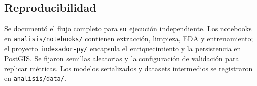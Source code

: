 \subsection*{Reproducibilidad}
Se documentó el flujo completo para su ejecución independiente. Los notebooks en \texttt{analisis/notebooks/} contienen extracción, limpieza, EDA y entrenamiento; el proyecto \texttt{indexador-py/} encapsula el enriquecimiento y la persistencia en PostGIS. Se fijaron semillas aleatorias y la configuración de validación para replicar métricas. Los modelos serializados y datasets intermedios se registraron en \texttt{analisis/data/}.

